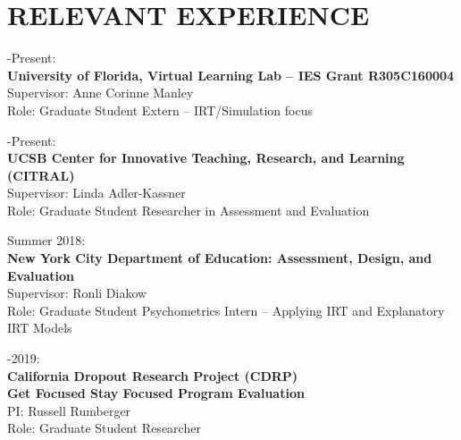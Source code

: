 \documentclass[12pt, oneside,]{memoir}
\begin{document}
\hypertarget{relevant-experience}{%
\section{RELEVANT EXPERIENCE}\label{relevant-experience}}
-Present:\\
\textbf{University of Florida, Virtual Learning Lab -- IES Grant R305C160004}\\
\hspace*{0.333em}\hspace*{0.333em} Supervisor: Anne Corinne Manley\\
\hspace*{0.333em}\hspace*{0.333em} Role: Graduate Student Extern -- IRT/Simulation focus

-Present:\\
\textbf{UCSB Center for Innovative Teaching, Research, and Learning
(CITRAL)}\\
\hspace*{0.333em}\hspace*{0.333em}Supervisor: Linda Adler-Kassner\\
\hspace*{0.333em}\hspace*{0.333em}Role: Graduate Student Researcher in
Assessment and Evaluation

\noindent Summer 2018:\\
\textbf{New York City Department of Education: Assessment, Design, and
Evaluation}\\
\hspace*{0.333em}\hspace*{0.333em}Supervisor: Ronli Diakow\\
\hspace*{0.333em}\hspace*{0.333em}Role: Graduate Student Psychometrics
Intern -- Applying IRT and Explanatory IRT Models

-2019:\\
\textbf{California Dropout Research Project (CDRP)}\\
\textbf{Get Focused Stay Focused Program Evaluation}\\
\hspace*{0.333em}\hspace*{0.333em}PI: Russell Rumberger\\
\hspace*{0.333em}\hspace*{0.333em}Role: Graduate Student Researcher
\end{document}
